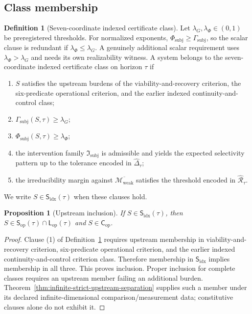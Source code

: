\documentclass[11pt,a4paper]{article}
\newtheorem{proposition}[theorem]{Proposition}
\theoremstyle{definition}
\newtheorem{definition}[theorem]{Definition}
\newcommand{\Cop}{\mathsf{C}_{\mathrm{op}}}
\newcommand{\Lop}{\mathsf{L}_{\mathrm{op}}}
\newcommand{\Subop}{\mathsf{S}_{\mathrm{op}}}
\newcommand{\Subfp}{\mathsf{S}_{\mathrm{idx}}}
\newcommand{\WeakFam}{\mathcal{M}_{\mathrm{weak}}}
\newcommand{\WeakClosure}{\overline{\WeakFam}}
\newcommand{\IntervFam}{\mathfrak{I}_{\mathrm{subj}}}
\newcommand{\IntervProf}{\Delta}
\newcommand{\Irred}{\mathcal{R}}
\newcommand{\GateSubj}{\Gamma_{\mathrm{subj}}}
\newcommand{\PhiSubj}{\Phi_{\mathrm{subj}}}
\begin{document}
\subsection{Class membership}
\begin{definition}[Seven-coordinate indexed certificate class]\label{def:subfp}
Let $\lambda_G,\lambda_\Phi \in (0,1)$ be preregistered thresholds. For normalized exponents, $\PhiSubj\ge\GateSubj$, so the scalar clause is redundant if $\lambda_\Phi\le\lambda_G$. A genuinely additional scalar requirement uses $\lambda_\Phi>\lambda_G$ and needs its own realizability witness. A system belongs to the seven-coordinate indexed certificate class on horizon $\tau$ if
\begin{enumerate}[leftmargin=1.5em]
\item $S$ satisfies the upstream burdens of the viability-and-recovery criterion, the six-predicate operational criterion, and the earlier indexed continuity-and-control class;
\item $\GateSubj(S,\tau)\ge \lambda_G$;
\item $\PhiSubj(S,\tau)\ge \lambda_\Phi$;
\item the intervention family $\IntervFam$ is admissible and yields the expected selectivity pattern up to the tolerance encoded in $\widehat{\IntervProf}_\tau$;
\item the irreducibility margin against $\WeakClosure$ satisfies the threshold encoded in $\widehat{\Irred}_\tau$.
\end{enumerate}
We write $S\in \Subfp(\tau)$ when these clauses hold.
\end{definition}

\begin{proposition}[Upstream inclusion]\label{prop:upstream-inclusion}
If $S\in\Subfp(\tau)$, then $S\in\Subop(\tau)\cap \Lop(\tau)$ and $S\in\Cop$.
\end{proposition}

\begin{proof}
Clause (1) of Definition~\ref{def:subfp} requires upstream membership in viability-and-recovery criterion, six-predicate operational criterion, and the earlier indexed continuity-and-control criterion class. Therefore membership in $\Subfp$ implies membership in all three. This proves inclusion. Proper inclusion for complete classes requires an upstream member failing an additional burden. Theorem~\ref{thm:infinite-strict-upstream-separation} supplies such a member under its declared infinite-dimensional comparison/measurement data; constitutive clauses alone do not exhibit it.
\end{proof}
\end{document}

